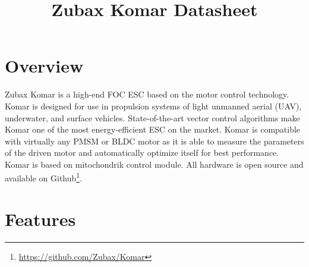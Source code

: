 \documentclass{../document_templates/documentation_template_latex/zubaxdoc}
\title{Zubax Komar Datasheet}
\begin{document}
\frontmatter
\begin{titlepage}

\section*{Overview}

Zubax Komar is a high-end FOC ESC based on the  motor control technology. Komar is designed for 
use in propulsion systems of light unmanned aerial (UAV), underwater, and surface vehicles. State-of-the-art vector 
control algorithms make Komar one of the most energy-efficient ESC on the market. Komar is compatible with virtually
 any PMSM or BLDC motor as it is able to measure the parameters of the driven motor and automatically optimize 
 itself for best performance. Komar is based on \mbox{mitochondrik} control module. All hardware is open source and available on Github\footnote{\url{https://github.com/Zubax/Komar}}.

\section*{Features}


\end{titlepage}
\end{document}

